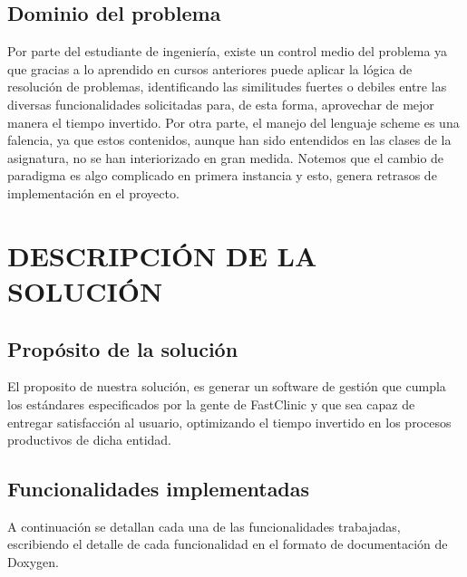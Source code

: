 \documentclass[12pt,letterpaper]{article}
\begin{document}
	\subsection{Dominio del problema}
	Por parte del estudiante de ingeniería, existe un control medio del problema ya que gracias a lo aprendido en cursos anteriores puede aplicar la lógica de resolución de problemas, identificando las similitudes fuertes o debiles entre las diversas funcionalidades solicitadas para, de esta forma, aprovechar de mejor manera el tiempo invertido. Por otra parte,  el manejo del lenguaje scheme es una falencia, ya que estos contenidos, aunque han sido entendidos en las clases de la asignatura, no se han interiorizado en gran medida. Notemos que el cambio de paradigma es algo complicado en primera instancia y esto, genera retrasos de implementación en el proyecto. 

\section{DESCRIPCIÓN DE LA SOLUCIÓN}
	\subsection{Propósito de la solución}
	El proposito de nuestra solución, es generar un software de gestión que cumpla los estándares especificados por la gente de FastClinic y que sea capaz de entregar satisfacción al usuario, optimizando el tiempo invertido en los procesos productivos de dicha entidad.
	
	
	\subsection{Funcionalidades implementadas}
	A continuación se detallan cada una de las funcionalidades trabajadas, escribiendo el detalle de cada funcionalidad en el formato de documentación de Doxygen.
	
\end{document}
